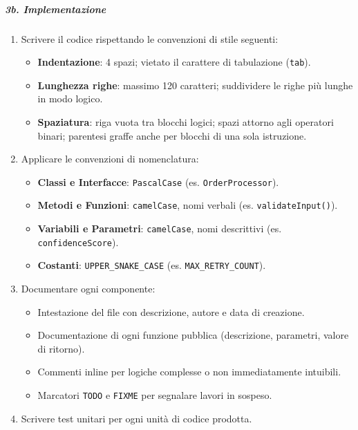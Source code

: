 \documentclass[a4paper, 11pt, oneside]{scrartcl}
\begin{document}
\subparagraph{3b. Implementazione}
\begin{enumerate}
    \item Scrivere il codice rispettando le convenzioni di stile seguenti:
          \begin{itemize}
              \item \textbf{Indentazione}: 4 spazi; vietato il carattere di tabulazione (\texttt{tab}).
              \item \textbf{Lunghezza righe}: massimo 120 caratteri; suddividere le righe più lunghe in modo logico.
              \item \textbf{Spaziatura}: riga vuota tra blocchi logici; spazi attorno agli operatori binari; parentesi graffe anche per blocchi di una sola istruzione.
          \end{itemize}
    \item Applicare le convenzioni di nomenclatura:
          \begin{itemize}
              \item \textbf{Classi e Interfacce}: \texttt{PascalCase}{\scriptsize{}} (es. \texttt{OrderProcessor}).
              \item \textbf{Metodi e Funzioni}: \texttt{camelCase}{\scriptsize{}}, nomi verbali (es. \texttt{validateInput()}).
              \item \textbf{Variabili e Parametri}: \texttt{camelCase}, nomi descrittivi (es. \texttt{confidenceScore}).
              \item \textbf{Costanti}: \texttt{UPPER\_SNAKE\_CASE} (es. \texttt{MAX\_RETRY\_COUNT}).
          \end{itemize}
    \item Documentare ogni componente:
          \begin{itemize}
              \item Intestazione del file con descrizione, autore e data di creazione.
              \item Documentazione di ogni funzione pubblica (descrizione, parametri, valore di ritorno).
              \item Commenti inline per logiche complesse o non immediatamente intuibili.
              \item Marcatori \texttt{TODO} e \texttt{FIXME} per segnalare lavori in sospeso.
          \end{itemize}
    \item Scrivere test unitari per ogni unità di codice prodotta.
\end{enumerate}
\end{document}
